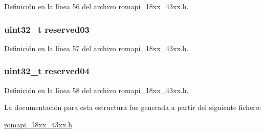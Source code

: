 Definición en la línea 56 del archivo romapi\+\_\+18xx\+\_\+43xx.\+h.

\subsubsection[{\texorpdfstring{reserved03}{reserved03}}]{\setlength{\rightskip}{0pt plus 5cm}uint32\+\_\+t reserved03}\hypertarget{struct_o_t_p___a_p_i___t_aea1729fb238d8d5d4f33e50303c67d4e}{}\label{struct_o_t_p___a_p_i___t_aea1729fb238d8d5d4f33e50303c67d4e}


Definición en la línea 57 del archivo romapi\+\_\+18xx\+\_\+43xx.\+h.

\subsubsection[{\texorpdfstring{reserved04}{reserved04}}]{\setlength{\rightskip}{0pt plus 5cm}uint32\+\_\+t reserved04}\hypertarget{struct_o_t_p___a_p_i___t_aef772adb3cdb4d8979ba092b71d8ba67}{}\label{struct_o_t_p___a_p_i___t_aef772adb3cdb4d8979ba092b71d8ba67}


Definición en la línea 58 del archivo romapi\+\_\+18xx\+\_\+43xx.\+h.



La documentación para esta estructura fue generada a partir del siguiente fichero\+:\begin{DoxyCompactItemize}
\item 
\hyperlink{romapi__18xx__43xx_8h}{romapi\+\_\+18xx\+\_\+43xx.\+h}\end{DoxyCompactItemize}
